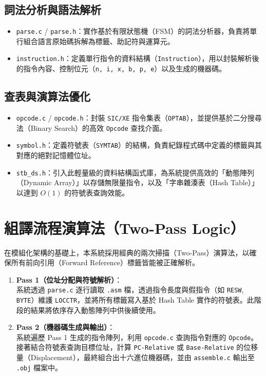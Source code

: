 \subsection{詞法分析與語法解析}
\begin{itemize}
    \item \lstinline{parse.c} / \lstinline{parse.h}：實作基於有限狀態機（FSM）的詞法分析器，負責將單行組合語言原始碼拆解為標籤、助記符與運算元。
    \item \lstinline{instruction.h}：定義單行指令的資料結構（\lstinline{Instruction}），用以封裝解析後的指令內容、控制位元（\lstinline{n, i, x, b, p, e}）以及生成的機器碼。
\end{itemize}

\subsection{查表與演算法優化}
\begin{itemize}
    \item \lstinline{opcode.c} / \lstinline{opcode.h}：封裝 \lstinline{SIC/XE} 指令集表（\lstinline{OPTAB}），並提供基於二分搜尋法（Binary Search）的高效 \lstinline{Opcode} 查找介面。
    \item \lstinline{symbol.h}：定義符號表（\lstinline{SYMTAB}）的結構，負責紀錄程式碼中定義的標籤與其對應的絕對記憶體位址。
    \item \lstinline{stb_ds.h}：引入此輕量級的資料結構函式庫，為系統提供高效的「動態陣列（Dynamic Array）」以存儲無限量指令，以及「字串雜湊表（Hash Table）」以達到 $O(1)$ 的符號表查詢效能。
\end{itemize}

\section{組譯流程演算法（Two-Pass Logic）}
在模組化架構的基礎上，本系統採用經典的兩次掃描（Two-Pass）演算法，以確保所有前向引用（Forward Reference）標籤皆能被正確解析。

\begin{enumerate}
    \item \textbf{Pass 1（位址分配與符號解析）}：\\
          系統透過 \lstinline{parse.c} 逐行讀取 \lstinline{.asm} 檔，透過指令長度與假指令（如 \lstinline{RESW}, \lstinline{BYTE}）維護 \lstinline{LOCCTR}，並將所有標籤寫入基於 Hash Table 實作的符號表。此階段的結果將依序存入動態陣列中供後續使用。

    \item \textbf{Pass 2（機器碼生成與輸出）}：\\
          系統遍歷 Pass 1 生成的指令陣列，利用 \lstinline{opcode.c} 查詢指令對應的 \lstinline{Opcode}。接著結合符號表查詢目標位址，計算 \lstinline{PC-Relative} 或 \lstinline{Base-Relative} 的位移量（Displacement），最終組合出十六進位機器碼，並由 \lstinline{assemble.c} 輸出至 \lstinline{.obj} 檔案中。
\end{enumerate}
